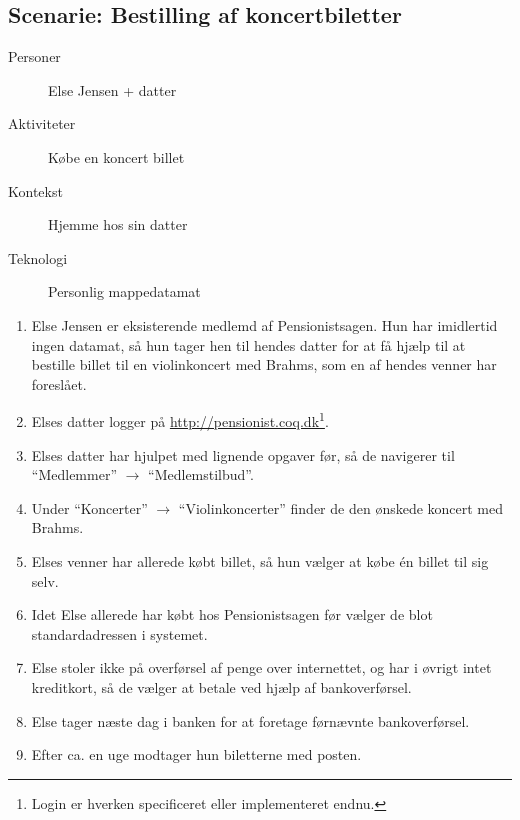 \subsection{Scenarie: Bestilling af koncertbiletter}

\begin{description}
    \item[Personer] Else Jensen + datter
    \item[Aktiviteter] Købe en koncert billet
    \item[Kontekst] Hjemme hos sin datter
    \item[Teknologi] Personlig mappedatamat
\end{description}

\begin{enumerate}
    \item Else Jensen er eksisterende medlemd af Pensionistsagen. Hun har
          imidlertid ingen datamat, så hun tager hen til hendes datter for at
          få hjælp til at bestille billet til en violinkoncert med Brahms,
          som en af hendes venner har foreslået.
    \item Elses datter logger på
          \url{http://pensionist.coq.dk}\footnote{Login er hverken
          specificeret eller implementeret endnu.}.
    \item Elses datter har hjulpet med lignende opgaver før, så de navigerer
          til ``Medlemmer'' $\to$ ``Medlemstilbud''.
    \item Under ``Koncerter'' $\to$ ``Violinkoncerter'' finder de den ønskede
          koncert med Brahms.
    \item Elses venner har allerede købt billet, så hun vælger at købe én
          billet til sig selv.
    \item Idet Else allerede har købt hos Pensionistsagen før vælger de blot
          standardadressen i systemet.
    \item Else stoler ikke på overførsel af penge over internettet, og
          har i øvrigt intet kreditkort, så de vælger at betale ved hjælp
          af bankoverførsel.
    \item Else tager næste dag i banken for at foretage førnævnte
          bankoverførsel.
    \item Efter ca. en uge modtager hun biletterne med posten.
\end{enumerate}
